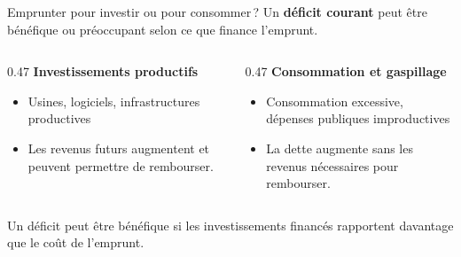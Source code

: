 \documentclass[aspectratio=169]{beamer}
\begin{document}
\begin{frame}[t]{Emprunter pour investir ou pour consommer\,?}
\small
Un \textbf{déficit courant} peut être bénéfique ou préoccupant selon ce que finance l'emprunt.
   \vspace{0.1cm}
   \begin{columns}[T]
      \begin{column}{0.47\textwidth}
         \textbf{\textcolor{HECgreen}{Investissements productifs}}
         \RaggedRight
         \begin{itemize}
            \setlength\itemsep{0.2cm}
            \item Usines, logiciels, infrastructures productives
            \item Les revenus futurs augmentent et peuvent permettre de rembourser.
         \end{itemize}
      \end{column}
      \begin{column}{0.47\textwidth}
         \textbf{\textcolor{HECcoral}{Consommation et gaspillage}}
         \RaggedRight
         \begin{itemize}
            \setlength\itemsep{0.2cm}
            \item Consommation excessive, dépenses publiques improductives
            \item La dette augmente sans les revenus nécessaires pour rembourser.
         \end{itemize}
      \end{column}
   \end{columns}
   \vspace{0.2cm}
   \begin{keyinsight}
      \RaggedRight
      Un déficit peut être bénéfique si les investissements financés rapportent davantage que le coût de l'emprunt.
   \end{keyinsight}
\end{frame}






\backupbegin
\renewcommand{\appendixname}{Compléments}
\appendix
\end{document}
